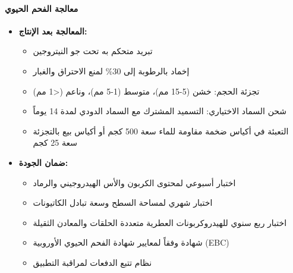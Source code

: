 \paragraph{معالجة الفحم الحيوي}
\begin{itemize}
    \item \textbf{المعالجة بعد الإنتاج:}
    \begin{itemize}
        \item تبريد متحكم به تحت جو النيتروجين
        \item إخماد بالرطوبة إلى 30\% لمنع الاحتراق والغبار
        \item تجزئة الحجم: خشن (5-15 مم)، متوسط (1-5 مم)، وناعم (<1 مم)
        \item شحن السماد الاختياري: التسميد المشترك مع السماد الدودي لمدة 14 يوماً
        \item التعبئة في أكياس ضخمة مقاومة للماء سعة 500 كجم أو أكياس بيع بالتجزئة سعة 25 كجم
    \end{itemize}
    
    \item \textbf{ضمان الجودة:}
    \begin{itemize}
        \item اختبار أسبوعي لمحتوى الكربون والأس الهيدروجيني والرماد
        \item اختبار شهري لمساحة السطح وسعة تبادل الكاتيونات
        \item اختبار ربع سنوي للهيدروكربونات العطرية متعددة الحلقات والمعادن الثقيلة
        \item شهادة وفقاً لمعايير شهادة الفحم الحيوي الأوروبية (EBC)
        \item نظام تتبع الدفعات لمراقبة التطبيق
    \end{itemize}
\end{itemize}

